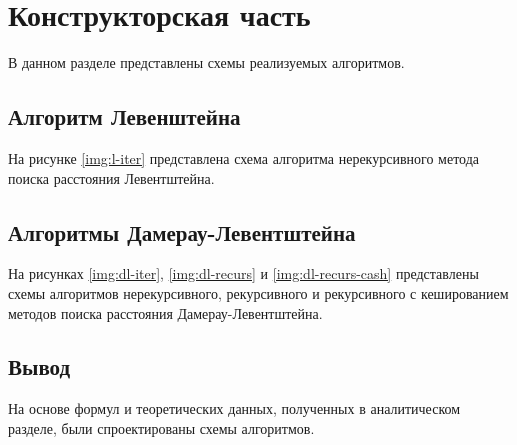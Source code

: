 \chapter{Конструкторская часть}

В данном разделе представлены схемы реализуемых алгоритмов.

\section{Алгоритм Левенштейна}

На рисунке \ref{img:l-iter} представлена схема алгоритма нерекурсивного метода поиска расстояния Левентштейна.


\section{Алгоритмы Дамерау-Левентштейна}
На рисунках \ref{img:dl-iter}, \ref{img:dl-recurs} и \ref{img:dl-recurs-cash} представлены схемы алгоритмов нерекурсивного, рекурсивного и рекурсивного с кешированием методов поиска расстояния Дамерау-Левентштейна.

\clearpage
{}

\section*{Вывод}

На основе формул и теоретических данных, полученных в аналитическом разделе, были спроектированы схемы алгоритмов.
